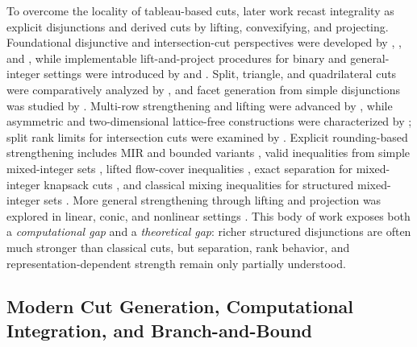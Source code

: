 \documentclass[11pt]{article}
\begin{document}
To overcome the locality of tableau-based cuts, later work recast integrality as explicit disjunctions and derived cuts by lifting, convexifying, and projecting. Foundational disjunctive and intersection-cut perspectives were developed by \citet{Balas_1972}, \citet{Bell_1975}, and \citet{Owen_2001}, while implementable lift-and-project procedures for binary and general-integer settings were introduced by \citet{Balas_1993} and \citet{Ceria_1998}. Split, triangle, and quadrilateral cuts were comparatively analyzed by \citet{Basu_2009}, and facet generation from simple disjunctions was studied by \citet{Sen_1986}. Multi-row strengthening and lifting were advanced by \citet{Dey_2010}, while asymmetric and two-dimensional lattice-free constructions were characterized by \citet{Dash_2011}; split rank limits for intersection cuts were examined by \citet{Dey_2009}. Explicit rounding-based strengthening includes MIR and bounded variants \citep{Atamt_rk_2009, Atamt_rk_2008}, valid inequalities from simple mixed-integer sets \citep{Dash_2005, Bienstock_2010}, lifted flow-cover inequalities \citep{unknown2000lifted}, exact separation for mixed-integer knapsack cuts \citep{Fukasawa_2009}, and classical mixing inequalities for structured mixed-integer sets \citep{Gunluk_2001}. More general strengthening through lifting and projection was explored in linear, conic, and nonlinear settings \citep{Richard_2008, Atamt_rk_2009, Castro_2021, Nguyen_2017, Saxena_2010, Tawarmalani_2010}. This body of work exposes both a \emph{computational gap} and a \emph{theoretical gap}: richer structured disjunctions are often much stronger than classical cuts, but separation, rank behavior, and representation-dependent strength remain only partially understood.

\subsection{Modern Cut Generation, Computational Integration, and Branch-and-Bound}
\end{document}
